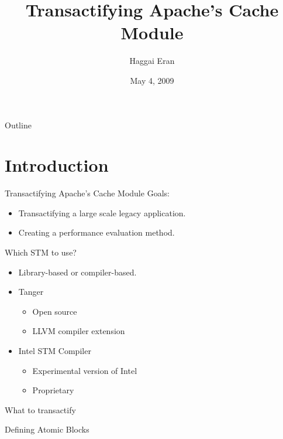 \documentclass[]{beamer}
\title{Transactifying Apache's Cache Module}
\date{May 4, 2009}
\author{Haggai Eran}
\newcommand{\Tanger}{{\sc Tanger}}
\begin{document}
\begin{frame}
    \titlepage
\end{frame}

\begin{frame}{Outline}
  \tableofcontents
\end{frame}

\section{Introduction}

\begin{frame}{Transactifying Apache's Cache Module}
    Goals:
    \begin{itemize}
        \item Transactifying a large scale legacy application.
        \item Creating a performance evaluation method.
    \end{itemize}    
\end{frame}

\begin{frame}{Which STM to use?}
    \begin{itemize}
        \item Library-based or compiler-based.
        \item {\Tanger}
            \begin{itemize}
                \item Open source
                \item LLVM compiler extension
            \end{itemize}
        \item Intel STM Compiler
            \begin{itemize}
                \item Experimental version of Intel
                \item Proprietary
            \end{itemize}
    \end{itemize}
\end{frame}

\begin{frame}{What to transactify}
\end{frame}

\begin{frame}{Defining Atomic Blocks}
\end{frame}
\end{document}
